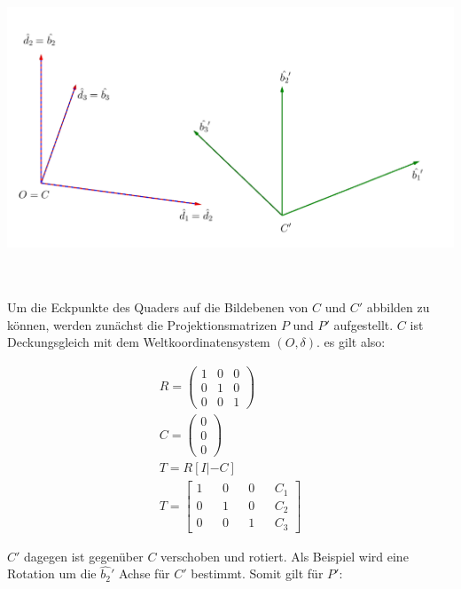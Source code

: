 \begin{minipage}{\linewidth}
	\centering
	\includegraphics[width=.52\linewidth]{images/KS_Minimalbeispiel_beschriftet.png}
	\label{fig:KoordsystemeMinimal}
\end{minipage}\\ \\

%
Um die Eckpunkte des Quaders auf die Bildebenen von $C$ und $C'$ abbilden zu können, werden zunächst die Projektionsmatrizen $P$ und $P'$ aufgestellt. $C$ ist Deckungsgleich mit dem Weltkoordinatensystem $(O,\delta)$. es gilt also:

\begin{gather}
R=\begin{pmatrix}
1&0&0\\
0&1&0\\
0&0&1
\end{pmatrix}\\
C=\begin{pmatrix}
0\\0\\0
\end{pmatrix}\\
T = R[I|-C]\\
T = \begin{bmatrix}
1&&0&&0&&C_1\\
0&&1&&0&&C_2\\
0&&0&&1&&C_3
\end{bmatrix}
\end{gather} 

$C'$ dagegen ist gegenüber $C$ verschoben und rotiert. Als Beispiel wird eine Rotation um die $\hat{b_2}'$ Achse für $C'$ bestimmt. Somit gilt für $P'$:

